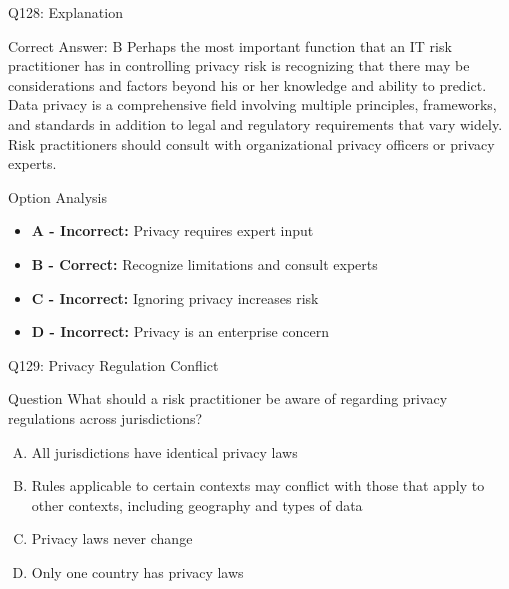 \documentclass{beamer}
\begin{document}
	\begin{frame}{Q128: Explanation}
		\begin{block}{Correct Answer: B}
			Perhaps the most important function that an IT risk practitioner has in controlling privacy risk is recognizing that there may be considerations and factors beyond his or her knowledge and ability to predict. Data privacy is a comprehensive field involving multiple principles, frameworks, and standards in addition to legal and regulatory requirements that vary widely. Risk practitioners should consult with organizational privacy officers or privacy experts.
		\end{block}
		\begin{block}{Option Analysis}
			\begin{itemize}
				\item \textbf{A - Incorrect:} Privacy requires expert input
				\item \textbf{B - Correct:} Recognize limitations and consult experts
				\item \textbf{C - Incorrect:} Ignoring privacy increases risk
				\item \textbf{D - Incorrect:} Privacy is an enterprise concern
			\end{itemize}
		\end{block}
	\end{frame}
	
	\begin{frame}{Q129: Privacy Regulation Conflict}
		\begin{block}{Question}
			What should a risk practitioner be aware of regarding privacy regulations across jurisdictions?
		\end{block}
		\begin{enumerate}[(A)]
			\item All jurisdictions have identical privacy laws
			\item Rules applicable to certain contexts may conflict with those that apply to other contexts, including geography and types of data
			\item Privacy laws never change
			\item Only one country has privacy laws
		\end{enumerate}
	\end{frame}
	
\end{document}

